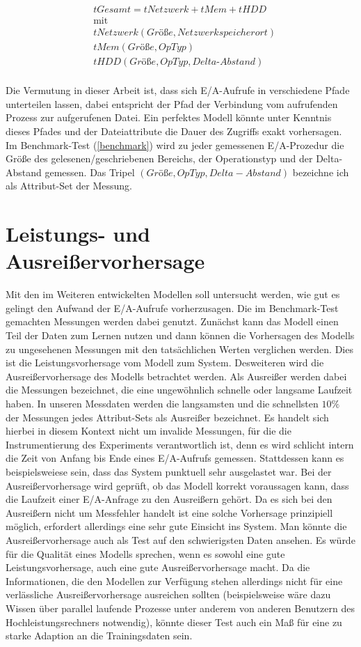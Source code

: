 \documentclass[
	12pt,
	a4paper,
	BCOR10mm,
	DIV14,
	listof=totoc,
	bibliography=totoc,
	headsepline
]{scrreprt}
\begin{document}
\begin{align*}
&tGesamt = tNetzwerk + tMem + tHDD\\
&\text{mit}\\
&tNetzwerk(Grö\text{ß}e, Netzwerkspeicherort)\\
&tMem(Grö\text{ß}e,OpTyp)\\
&tHDD(Grö\text{ß}e,OpTyp,Delta\text{-}Abstand)\\
\end{align*}

Die Vermutung in dieser Arbeit ist, dass sich E/A-Aufrufe in verschiedene Pfade unterteilen lassen, dabei entspricht der Pfad der Verbindung vom aufrufenden Prozess zur aufgerufenen Datei. Ein perfektes Modell könnte unter Kenntnis dieses Pfades und der Dateiattribute die Dauer des Zugriffs exakt vorhersagen.\\
Im Benchmark-Test (\ref{benchmark}) wird zu jeder gemessenen E/A-Prozedur die Größe des gelesenen/geschriebenen Bereichs, der Operationstyp und der Delta-Abstand gemessen.
Das Tripel $(Grö\text{ß}e,OpTyp,Delta-Abstand)$ bezeichne ich als Attribut-Set der Messung.

\section{Leistungs- und Ausreißervorhersage}
Mit den im Weiteren entwickelten Modellen soll untersucht werden, wie gut es gelingt den Aufwand der E/A-Aufrufe vorherzusagen. 
Die im Benchmark-Test gemachten Messungen werden dabei genutzt. Zunächst kann das Modell einen Teil der Daten zum Lernen nutzen und dann können die Vorhersagen des Modells zu ungesehenen Messungen mit den tatsächlichen Werten verglichen werden. Dies ist die Leistungsvorhersage vom Modell zum System. 
Desweiteren wird die Ausreißervorhersage des Modells betrachtet werden. Als Ausreißer werden dabei die Messungen bezeichnet, die eine ungewöhnlich schnelle oder langsame Laufzeit haben. In unseren Messdaten werden die langsamsten und die schnellsten $10\%$ der Messungen jedes Attribut-Sets als Ausreißer bezeichnet. Es handelt sich hierbei in diesem Kontext nicht um invalide Messungen, für die die Instrumentierung des Experiments verantwortlich ist, denn es wird schlicht intern die Zeit von Anfang bis Ende eines E/A-Aufrufs gemessen. Stattdessen kann es beispielsweiese sein, dass das System punktuell sehr ausgelastet war. 
Bei der Ausreißervorhersage wird geprüft, ob das Modell korrekt voraussagen kann, dass die Laufzeit einer E/A-Anfrage zu den Ausreißern gehört. Da es sich bei den Ausreißern nicht um Messfehler handelt ist eine solche Vorhersage prinzipiell möglich, erfordert allerdings eine sehr gute Einsicht ins System.
Man könnte die Ausreißervorhersage auch als Test auf den schwierigsten Daten ansehen. Es würde für die Qualität eines Modells sprechen, wenn es sowohl eine gute Leistungsvorhersage, auch eine gute Ausreißervorhersage macht. Da die Informationen, die den Modellen zur Verfügung stehen allerdings nicht für eine verlässliche Ausreißervorhersage ausreichen sollten (beispielsweise wäre dazu Wissen über parallel laufende Prozesse unter anderem von anderen Benutzern des Hochleistungsrechners notwendig), könnte dieser Test auch ein Maß für eine zu starke Adaption an die Trainingsdaten sein.
\end{document}
